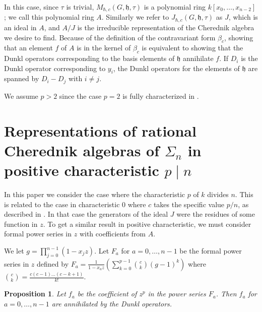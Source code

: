 \documentclass{article}
\numberwithin{equation}{section}
\newtheorem{proposition}[equation]{Proposition}
\newcommand{\h}{\mathfrak{h}}
\begin{document}
In this case, since $\tau$ is trivial, $M_{\hbar,c}(G,\h,\tau)$ is a polynomial ring $k[x_0,\dots,x_{n-2}]$; we call this polynomial ring $A$. Similarly we refer to $J_{\hbar,c}(G,\h,\tau)$ as $J$, which is an ideal in $A$, and $A/J$ is the irreducible representation of the Cherednik algebra we desire to find. Because of the definition of the contravariant form $\beta_c$, showing that an element $f$ of $A$ is in the kernel of $\beta_c$ is equivalent to showing that the Dunkl operators corresponding to the basis elements of $\h$ annihilate $f$. If $D_i$ is the Dunkl operator corresponding to $y_i$, the Dunkl operators for the elements of $\h$ are spanned by $D_i-D_j$ with $i \ne j$. 

We assume $p>2$ since the case $p=2$ is fully characterized in \cite{L}.


\section{Representations of rational Cherednik algebras of $\Sigma_n$ in positive characteristic $p \mid n$}

In this paper we consider the case where the characteristic $p$ of $k$ divides $n$. This is related to the case in characteristic $0$ where $c$ takes the specific value $p/n$, as described in \cite{CE}. In that case the generators of the ideal $J$ were the residues of some function in $z$. To get a similar result in positive characteristic, we must consider formal power series in $z$ with coefficients from $A$. 

We let $g=\prod_{j=0}^{n-1} (1-x_jz)$. Let $F_a$ for $a=0,\dots,n-1$ be the formal power series in $z$ defined by $F_a=\frac{1}{1-x_az} \left( \sum_{k=0}^{p-1} \binom{c}{k}(g-1)^k\right)$ where $\binom{c}{k}=\frac{c(c-1)\dots(c-k+1)}{k!}$. 

\begin{proposition}\label{prop:ann} Let $f_a$ be the coefficient of $z^p$ in the power series $F_a$. Then $f_a$ for $a=0,\dots,n-1$ are annihilated by the Dunkl operators. 
\end{proposition}
\end{document}
